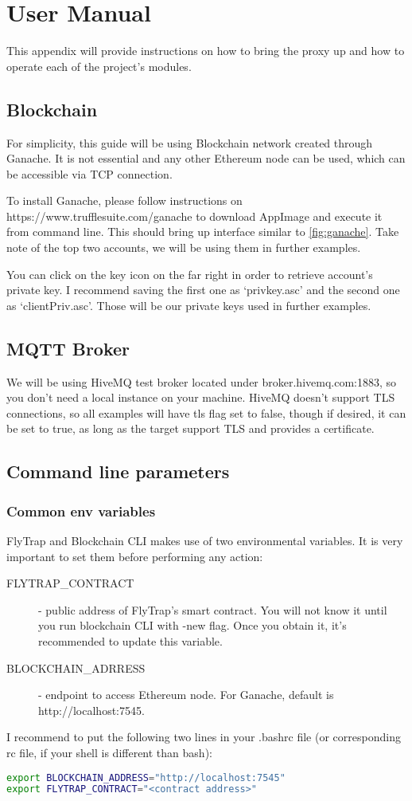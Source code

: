 \chapter{User Manual}
This appendix will provide instructions on how to bring the proxy up and how to operate each of the project's modules.
\section{Blockchain}
For simplicity, this guide will be using Blockchain network created through Ganache. It is not essential and any other Ethereum node can be used, which can be accessible via TCP connection.

To install Ganache, please follow instructions on https://www.trufflesuite.com/ganache to download AppImage and execute it from command line. This should bring up interface similar to \ref{fig:ganache}. Take note of the top two accounts, we will be using them in further examples.

You can click on the key icon on the far right in order to retrieve account's private key. I recommend saving the first one as `privkey.asc' and the second one as `clientPriv.asc'. Those will be our private keys used in further examples.
\section{MQTT Broker}
We will be using HiveMQ test broker located under broker.hivemq.com:1883, so you don't need a local instance on your machine. HiveMQ doesn't support TLS connections, so all examples will have tls flag set to false, though if desired, it can be set to true, as long as the target support TLS and provides a certificate.
\section{Command line parameters}
\subsection{Common env variables}\label{sec:envvars}
FlyTrap and Blockchain CLI makes use of two environmental variables. It is very important to set them before performing any action:
\begin{description}
  \item[FLYTRAP\_CONTRACT] - public address of FlyTrap's smart contract. You will not know it until you run blockchain CLI with -new flag. Once you obtain it, it's recommended to update this variable.
  \item[BLOCKCHAIN\_ADRRESS] - endpoint to access Ethereum node. For Ganache, default is http://localhost:7545.
\end{description}
I recommend to put the following two lines in your .bashrc file (or corresponding rc file, if your shell is different than bash):
\begin{lstlisting}[language=bash,breaklines=true]
export BLOCKCHAIN_ADDRESS="http://localhost:7545"
export FLYTRAP_CONTRACT="<contract address>"
\end{lstlisting}
